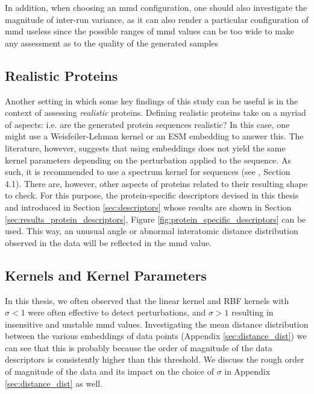 In addition, when choosing an \acrshort{mmd} configuration, one should also investigate the
magnitude of inter-run variance, as it can also render a particular
configuration of \acrshort{mmd} useless since the possible ranges of \acrshort{mmd} values can be too
wide to make any assessment as to the quality of the generated samples

\subsection{Realistic Proteins}\label{sec:discussion_realistic_proteins}

Another setting in which some key findings of this study can be useful is in the
context of assessing \emph{realistic} proteins. Defining realistic proteins take on a
myriad of aspects: i.e. are the generated protein sequences realistic? In this
case, one might use a Weisfeiler-Lehman kernel or an ESM embedding to answer
this. The literature, however, suggests that using embeddings does not yield the
same kernel parameters depending on the perturbation applied to the sequence. As
such, it is recommended to use a spectrum kernel \citep{leslie2001spectrum} for
sequences (see \cite{kucera2021conditional}, Section 4.1). There are, however,
other aspects of proteins related to their resulting shape to check. For this
purpose, the protein-specific descriptors devised in this thesis and introduced in
Section \ref{sec:descriptors} whose results are shown in Section
\ref{sec:results_protein_descriptors}, Figure
\ref{fig:protein_specific_descriptors} can be used. This way, an unusual angle
or abnormal interatomic distance distribution observed in the data will be
reflected in the \acrshort{mmd} value.

\subsection{Kernels and Kernel Parameters}
In this thesis, we often observed that the linear kernel and RBF kernels with
$\sigma<1$ were often effective to detect perturbations, and $\sigma>1$
resulting in insensitive and unstable \acrshort{mmd} values. Investigating the mean
distance distribution between the various embeddings of data points (Appendix
\ref{sec:distance_dist}) we can see that this is probably because the order of
magnitude of the data descriptors is consistently higher than this threshold. We
discuss the rough order of magnitude of the data and its impact on the choice of
$\sigma$ in Appendix \ref{sec:distance_dist} as well.


